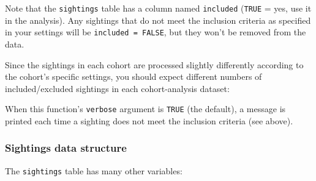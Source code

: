\documentclass[
]{book}
\newenvironment{Shaded}{\begin{snugshade}}{\end{snugshade}}
\newcommand{\DecValTok}[1]{\textcolor[rgb]{0.00,0.00,0.81}{#1}}
\newcommand{\NormalTok}[1]{#1}
\newcommand{\OperatorTok}[1]{\textcolor[rgb]{0.81,0.36,0.00}{\textbf{#1}}}
\newcommand{\OtherTok}[1]{\textcolor[rgb]{0.56,0.35,0.01}{#1}}
\newcommand{\StringTok}[1]{\textcolor[rgb]{0.31,0.60,0.02}{#1}}
\begin{document}
Note that the \texttt{sightings} table has a column named \texttt{included} (\texttt{TRUE} = yes, use it in the analysis). Any sightings that do not meet the inclusion criteria as specified in your settings will be \texttt{included\ =\ FALSE}, but they won't be removed from the data.

Since the sightings in each cohort are processed slightly differently according to the cohort's specific settings, you should expect different numbers of included/excluded sightings in each cohort-analysis dataset:

\begin{Shaded}
\end{Shaded}

When this function's \texttt{verbose} argument is \texttt{TRUE} (the default), a message is printed each time a sighting does not meet the inclusion criteria (see above).

\hypertarget{sightings-data-structure}{%
\subsubsection*{Sightings data structure}\label{sightings-data-structure}}

The \texttt{sightings} table has many other variables:
\end{document}
